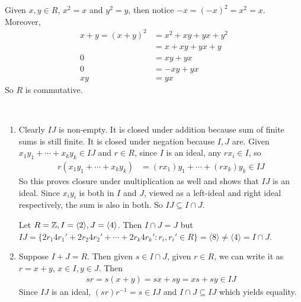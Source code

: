 \documentclass[12pt]{article}
\begin{document}
\begin{problem}[6]
Given $ x,y \in R$, $ x^2 = x$ and $ y^2 = y$, then notice $-x = (-x)^2 = x^2 = x$. Moreover,
\begin{align*}
	x+y=(x+y)^2 &= x^2 + xy+yx+y^2 \\
	&= x+xy+yx+y \\
	0 &= xy+yx \\
	0 &= -xy + yx \\
	xy &= yx 
\end{align*}
So $ R$ is commutative.
\end{problem}

\begin{problem}[7]
~\begin{enumerate}[label=(\alph*)]
	\item Clearly $ IJ$ is non-empty. It is closed under addition because sum of finite sums is still finite. It is closed under negation because  $ I,J$ are. Given  $ x_1 y_1+ \cdots + x_ky_k \in IJ$ and $ r \in R$, since $ I$ is an ideal, any  $ rx_i \in I$, so
		\begin{align*}
			r(x_1y_1 + \cdots +x_k y_k) &= (rx_1)y_1+ \cdots + (rx_k)y_k \in IJ
		\end{align*}
	So this proves closure under multiplication as well and shows that $ IJ$ is an ideal. Since  $ x_i y_i$ is both in $ I$ and $ J$, viewed as a left-ideal and right ideal respectively, the sum is also in both. So  $ IJ \subseteq I \cap J$. 

	Let $R= \mathbb{Z}, I = \langle 2 \rangle, J = \langle 4 \rangle$. Then $ I \cap J = J$ but $ IJ = \{2r_1 4r_1' + 2r_2 4 r_2' + \cdots + 2r_k 4 r_k' : r_i, r_i' \in R\} = \langle 8 \rangle \neq \langle 4 \rangle = I \cap J$.
\item Suppose $ I+J = R$. Then given  $ s \in I \cap J$, given $ r \in R$, we can write it as $ r= x+y$,  $ x \in I,y \in J$. Then
	\begin{align*}
		sr = s(x+y) = sx+ sy=xs + sy \in IJ
	\end{align*}
	Since $ IJ$ is an ideal, $ (s r) r^{-1} = s \in IJ$ and $ I \cap J \subseteq IJ$ which yields equality.
\end{enumerate}
\end{problem}
\end{document}
